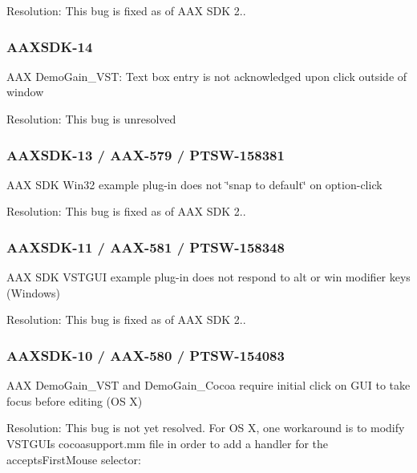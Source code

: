 Resolution\+: This bug is fixed as of A\+AX S\+DK 2..\hypertarget{a00846_AAXSDK-14}{}\subsubsection{A\+A\+X\+S\+D\+K-\/14}\label{a00846_AAXSDK-14}
A\+AX Demo\+Gain\+\_\+\+V\+ST\+: Text box entry is not acknowledged upon click outside of window

Resolution\+: This bug is unresolved\hypertarget{a00846_AAXSDK-13}{}\subsubsection{A\+A\+X\+S\+D\+K-\/13 / A\+A\+X-\/579 / P\+T\+S\+W-\/158381}\label{a00846_AAXSDK-13}
A\+AX S\+DK Win32 example plug-\/in does not \char`\"{}snap to default\char`\"{} on option-\/click

Resolution\+: This bug is fixed as of A\+AX S\+DK 2..\hypertarget{a00846_AAXSDK-11}{}\subsubsection{A\+A\+X\+S\+D\+K-\/11 / A\+A\+X-\/581 / P\+T\+S\+W-\/158348}\label{a00846_AAXSDK-11}
A\+AX S\+DK V\+S\+T\+G\+UI example plug-\/in does not respond to \textquotesingle{}alt\textquotesingle{} or \textquotesingle{}win\textquotesingle{} modifier keys (Windows)

Resolution\+: This bug is fixed as of A\+AX S\+DK 2..\hypertarget{a00846_AAXSDK-10}{}\subsubsection{A\+A\+X\+S\+D\+K-\/10 / A\+A\+X-\/580 / P\+T\+S\+W-\/154083}\label{a00846_AAXSDK-10}
A\+AX Demo\+Gain\+\_\+\+V\+ST and Demo\+Gain\+\_\+\+Cocoa require initial click on G\+UI to take focus before editing (OS X)

Resolution\+: This bug is not yet resolved. For OS X, one workaround is to modify V\+S\+T\+G\+UI\textquotesingle{}s cocoasupport.\+mm file in order to add a handler for the accepts\+First\+Mouse selector\+:


\begin{DoxyCode}{0}
\DoxyCodeLine{  \textcolor{keywordtype}{id} \textcolor{keyword}{self},}
\DoxyCodeLine{\{}
\DoxyCodeLine{\}}
\DoxyCodeLine{}
\DoxyCodeLine{\textcolor{comment}{// In VSTGUI\_NSView\_isOpaque()}}
\DoxyCodeLine{  \textcolor{stringliteral}{"B@:@:"});}
\end{DoxyCode}


